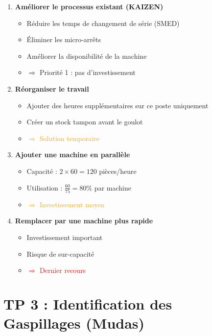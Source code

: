\documentclass[12pt,a4paper]{article}
\begin{document}
\begin{enumerate}[leftmargin=*]
    \item \textbf{Améliorer le processus existant (KAIZEN)}
    \begin{itemize}
        \item Réduire les temps de changement de série (SMED)
        \item Éliminer les micro-arrêts
        \item Améliorer la disponibilité de la machine
        \item \textcolor{uimmblue}{$\Rightarrow$ Priorité 1 : pas d'investissement}
    \end{itemize}
    
    \item \textbf{Réorganiser le travail}
    \begin{itemize}
        \item Ajouter des heures supplémentaires sur ce poste uniquement
        \item Créer un stock tampon avant le goulot
        \item \textcolor{orange}{$\Rightarrow$ Solution temporaire}
    \end{itemize}
    
    \item \textbf{Ajouter une machine en parallèle}
    \begin{itemize}
        \item Capacité : $2 \times 60 = 120$ pièces/heure
        \item Utilisation : $\frac{60}{75} = 80\%$ par machine
        \item \textcolor{orange}{$\Rightarrow$ Investissement moyen}
    \end{itemize}
    
    \item \textbf{Remplacer par une machine plus rapide}
    \begin{itemize}
        \item Investissement important
        \item Risque de sur-capacité
        \item \textcolor{red}{$\Rightarrow$ Dernier recours}
    \end{itemize}
\end{enumerate}

\newpage

\section{TP 3 : Identification des Gaspillages (Mudas)}
\end{document}

